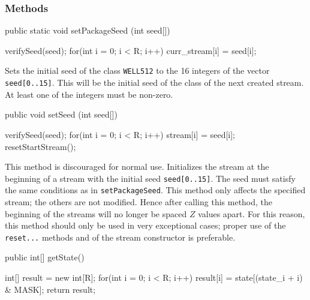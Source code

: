 \subsubsection* {Methods}
\begin{code}
   public static void setPackageSeed (int seed[]) \begin{hide} {
      verifySeed(seed);
      for(int i = 0; i < R; i++)
         curr_stream[i] = seed[i];
   } \end{hide}
\end{code}
\begin{tabb} Sets the initial seed of the class \texttt{WELL512} to the 16
  integers of the vector \texttt{seed[0..15]}.
  This will be the initial seed of the class of the next created stream.
  At least one of the integers must be non-zero.
\end{tabb}
\begin{htmlonly}
\end{htmlonly}
\begin{code}

   public void setSeed (int seed[]) \begin{hide} {
      verifySeed(seed);
      for(int i = 0; i < R; i++)
         stream[i] = seed[i];
      resetStartStream();
   } \end{hide}
\end{code}
\begin{tabb} This method is discouraged for normal use.
  Initializes the stream at the beginning of a stream with the initial
  seed \texttt{seed[0..15]}. The seed must satisfy the same
  conditions as in \texttt{setPackageSeed}.
  This method only affects the specified stream; the others are not
  modified.  Hence after calling this method, the beginning of the streams
  will no longer be spaced $Z$ values apart.
  For this reason, this method should only be used in very exceptional cases;
  proper use of the \texttt{reset...} methods and of the stream constructor is
  preferable.
\end{tabb}
\begin{htmlonly}
\end{htmlonly}
\begin{code}

   public int[] getState() \begin{hide} {
      int[] result = new int[R];
      for(int i = 0; i < R; i++)
         result[i] = state[(state_i + i) & MASK];
      return result;
   } \end{hide}
\end{code}
